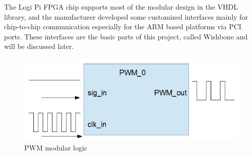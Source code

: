 \documentclass[11pt,openright,a4paper]{report}
\begin{document}
The Logi Pi FPGA chip supports most of the modular design in the VHDL library, and the manufacturer developed some customized interfaces mainly for chip-to-chip communication especially for the ARM based platforms via PCI ports. These interfaces are the basic parts of this project, called Wishbone and will be discussed later.\\  
\begin{figure}[H]
\centering
\includegraphics[width=0.5\linewidth]{picture/pwm}
\caption{PWM modular logic}
\label{fig:pwm}
\end{figure}
\end{document}
